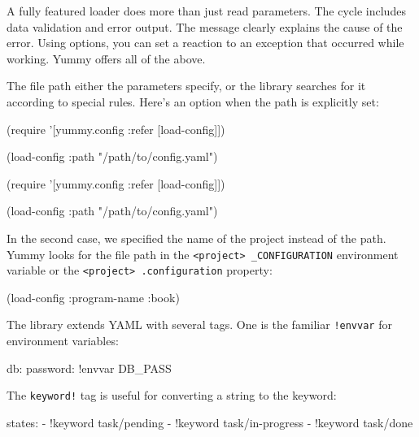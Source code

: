 A fully featured loader does more than just read parameters. The cycle includes data validation and error output. The message clearly explains the cause of the error. Using options, you can set a reaction to an exception that occurred while working. Yummy offers all of the above.

The file path either the parameters specify, or the library searches for it according to special rules. Here's an option when the path is explicitly set:

\ifx\DEVICETYPE\MOBILE

\begin{clojure}
(require
  '[yummy.config :refer [load-config]])

(load-config
  {:path "/path/to/config.yaml"})
\end{clojure}

\else

\begin{clojure}
(require '[yummy.config :refer [load-config]])

(load-config {:path "/path/to/config.yaml"})
\end{clojure}

\fi

In the second case, we specified the name of the project instead of the path. Yummy looks for the file path in the \verb|<project> _CONFIGURATION| environment variable or the \verb|<project> .configuration| property:


\begin{clojure}
(load-config {:program-name :book})
\end{clojure}

The library extends YAML with several tags. One is the familiar \verb|!envvar| for environment variables:


\begin{yaml}
db:
  password: !envvar DB_PASS
\end{yaml}

\noindent
The \verb|keyword!| tag is useful for converting a string to the keyword:

\begin{yaml}
states:
  - !keyword task/pending
  - !keyword task/in-progress
  - !keyword task/done
\end{yaml}

